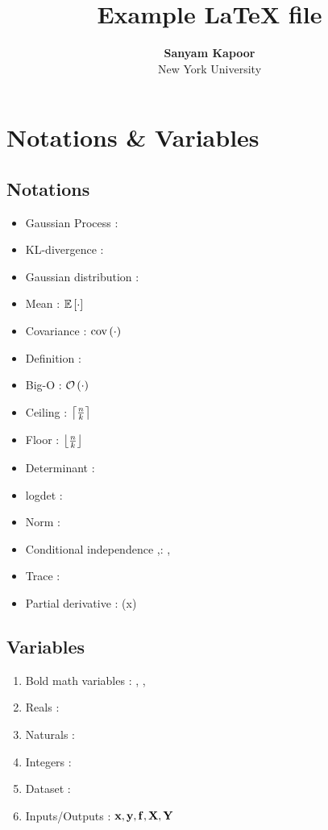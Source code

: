 \documentclass[11pt]{article}
\date{}
\title{\textbf{Example \LaTeX{ }file}}
\author{
\textbf{Sanyam Kapoor} \\ New York University
}
\begin{document}
\maketitle

\section{Notations \& Variables}

\subsection{Notations}

\begin{itemize}
\item Gaussian Process \vrb{\gp{\cdot,\cdot}}: \gp{\cdot,\cdot}
\item KL-divergence \vrb{\kl}: \kl
\item Gaussian distribution \vrb{\gaussian{}}: \gaussian{\cdot, \cdot}
\item Mean \vrb{\mean{\cdot}}: $\mathbb{E}\left[\cdot\right]$
\item Covariance \vrb{\cov{\cdor}}: $\mathrm{cov}\left(\cdot\right)$
\item Definition : 
\item Big-O \vrb{\bigo{\cdot}}:  $\mathcal{O}\left(\cdot\right)$
\item Ceiling : $\left\lceil \tfrac{n}{k} \right\rceil$
\item Floor : $\left\lfloor \tfrac{n}{k} \right\rfloor$
\item Determinant \vrb{\determ{}}: \determ{\cdot}
\item logdet \vrb{\logdet{}}: \logdet{\cdot}
\item Norm \vrb{\norm{}}: \norm{\cdot}
\item Conditional independence \vrb{\ci},\vrb{\nci}: \ci, \nci
\item Trace \vrb{\tr{}}: \tr{\cdot}
\item Partial derivative \vrb{\pd{}{}}: (x)
\end{itemize}

\subsection{Variables}
\begin{enumerate}%
\item Bold math variables \vrb{\mbf{}}: \mbf{\Sigma}, ,
\item Reals \vrb{\reals}: \reals
\item Naturals \vrb{\naturals}: \naturals
\item Integers \vrb{\ints}: \ints
\item Dataset \vrb{\dset}: \dset
\item Inputs/Outputs \vrb{\xvec,\yvec,\fvec,\Xvec,\Yvec}: ${\boldsymbol{\mathbf{x}}},{\boldsymbol{\mathbf{y}}},{\boldsymbol{\mathbf{f}}},{\boldsymbol{\mathbf{X}}},{\boldsymbol{\mathbf{Y}}}$
\end{enumerate}
\end{document}
